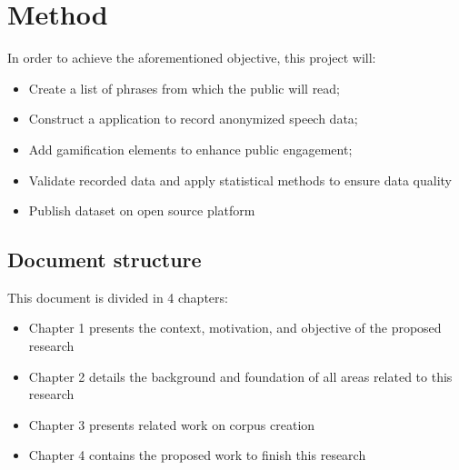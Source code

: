 \chapter{Method}

In order to achieve the aforementioned objective, this project will:

\begin{itemize}
    \item Create a list of phrases from which the public will read;
    \item Construct a application to record anonymized speech data;
    \item Add gamification elements to enhance public engagement;
    \item Validate recorded data and apply statistical methods to ensure data quality
    \item Publish dataset on open source platform
\end{itemize}

\section{Document structure}

This document is divided in 4 chapters:

\begin{itemize}
    \item Chapter 1 presents the context, motivation, and objective of the proposed research
    \item Chapter 2 details the background and foundation of all areas related to this research
    \item Chapter 3 presents related work on corpus creation
    \item Chapter 4 contains the proposed work to finish this research
\end{itemize}
